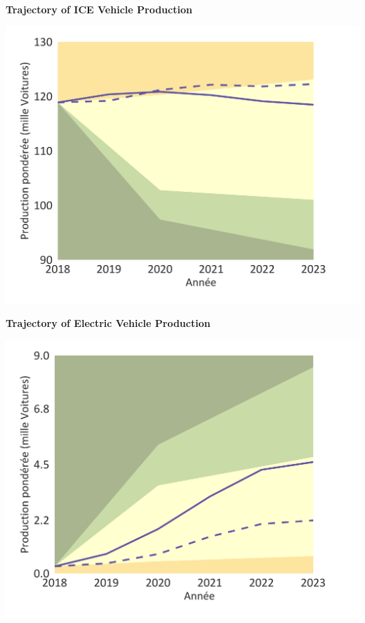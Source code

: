 \documentclass[10pt,table,a4]{article}\usepackage[]{graphicx}\usepackage[]{color}
\begin{document}
	
	\begin{minipage}[t]{.49\linewidth}
		\textbf{Trajectory of ICE Vehicle Production}
		
		\includegraphics[trim = {0 0cm 0 0},width=1\linewidth]{ReportOutputs/Fig14}
		
	\end{minipage}	
	\hspace{.02\linewidth}
	\begin{minipage}[t]{.49\textwidth}
		\textbf{Trajectory of Electric Vehicle Production}
		
		\includegraphics[trim = {0 0cm 0 0},width=1\linewidth]{ReportOutputs/Fig15}
		
	\end{minipage}	
\end{document}

